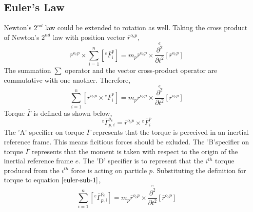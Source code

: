 \documentclass[class=report, 12pt, crop=false]{standalone}
\begin{document}
\begin{center}
\section{Euler's Law}
\begin{comment}
\end{comment}
Newton's $2^{nd}$ law could be extended to rotation as well. Taking the cross product of Newton's $2^{nd}$ law with position vector $\bar{r}^{o_{e}p}$,
$$\bar{r}^{o_{e}p}\times\sum^{n}_{i = 1}\left[{}^{e}\bar{F}^{p}_{i}\right] = m_{p}\bar{r}^{o_{e}p}\times\overset{e}{\frac{\partial^{2}}{\partial t^{2}}}[\bar{r}^{o_{e}p}]$$
The summation $\displaystyle\sum$ operator and the vector cross-product operator are commutative with one another. Therefore,
\begin{equation}\sum^{n}_{i = 1}\left[\bar{r}^{o_{e}p}\times{}^{e}\bar{F}^{p}_{i}\right] = m_{p}\bar{r}^{o_{e}p}\times\overset{e}{\frac{\partial^{2}}{\partial t^{2}}}[\bar{r}^{o_{e}p}]\label{euler-sub-1}\end{equation}
Torque $\bar{\Gamma}$ is defined as shown below,
$${}^{e}\bar{\Gamma}^{o_{e}}_{p,i} = \bar{r}^{o_{e}p}\times{}^{e}\bar{F}^{p}_{i}$$
The 'A' specifier on torque $\bar{\Gamma}$ represents that the torque is perceived in an inertial reference frame. This means ficitious forces should be exluded. The 'B'specifier on torque $\bar{\Gamma}$ represents that the moment is taken with respect to the origin of the inertial reference frame $e$. The 'D' specifier is to represent that the $i^{th}$ torque produced from the $i^{th}$ force is acting on particle $p$. Substituting the definition for torque to equation $\ref{euler-sub-1}$,
\begin{equation}\sum^{n}_{i = 1}\left[{}^{e}\bar{\Gamma}^{o_{e}}_{p,i}\right] = m_{p}\bar{r}^{o_{e}p}\times\overset{e}{\frac{\partial^{2}}{\partial t^{2}}}[\bar{r}^{o_{e}p}]\label{euler-sub-2}\end{equation}


\end{center}
\end{document}
